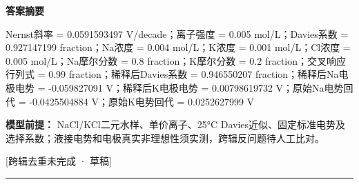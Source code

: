 \documentclass[UTF8,11pt,a4paper]{ctexart}
\begin{document}
\noindent\textbf{答案摘要}\par
Nernst斜率 = 0.0591593497 V/decade；离子强度 = 0.005 mol/L；Davies系数 = 0.927147199 fraction；Na浓度 = 0.004 mol/L；K浓度 = 0.001 mol/L；Cl浓度 = 0.005 mol/L；Na摩尔分数 = 0.8 fraction；K摩尔分数 = 0.2 fraction；交叉响应行列式 = 0.99 fraction；稀释后Davies系数 = 0.946550207 fraction；稀释后Na电极电势 = -0.059827091 V；稀释后K电极电势 = 0.00798619732 V；原始Na电势回代 = -0.0425504884 V；原始K电势回代 = 0.0252627999 V\par
\noindent\textbf{模型前提：}
NaCl/KCl二元水样、单价离子、25°C Davies近似、固定标准电势及选择系数；液接电势和电极真实非理想性须实测，跨辑反问题待人工比对。\par
\noindent\textcolor{red!65!black}{[跨辑去重未完成 · 草稿]} \par
\medskip\hrule\medskip
{}
\end{document}
